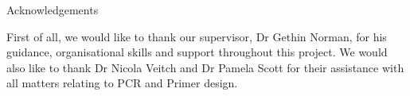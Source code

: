 \centerline{Acknowledgements}

First of all, we would like to thank our supervisor, Dr Gethin Norman, for his guidance, organisational skills and support throughout this project. We would also like to thank Dr Nicola Veitch and Dr Pamela Scott for their assistance with all matters relating to PCR and Primer design.
